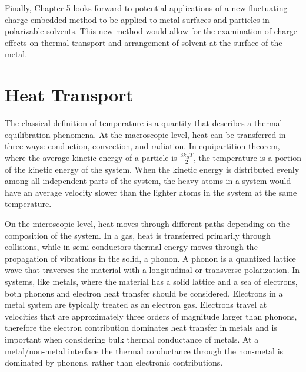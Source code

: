 Finally, Chapter 5 looks forward to potential applications of a new fluctuating charge embedded method to be applied to metal surfaces and particles in polarizable solvents. This new method would allow for the examination of charge effects on thermal transport and arrangement of solvent at the surface of the metal.

\section{Heat Transport}
The classical definition of temperature is a quantity that describes a thermal equilibration phenomena. At the macroscopic level, heat can be transferred in three ways: conduction, convection, and radiation.\cite{Chen2005} 
In equipartition theorem, where the average kinetic energy of a particle is \(\frac{3k_{B}T}{2}\), the temperature is a portion of the kinetic energy of the system. \cite{Goldstein2001}
When the kinetic energy is distributed evenly among all independent parts of the system, the heavy atoms in a system would have an average velocity slower than the lighter atoms in the system at the same temperature.

On the microscopic level, heat moves through different paths depending on the composition of the system.\cite{Chen2005}
In a gas, heat is transferred primarily through collisions, while in semi-conductors thermal energy moves through the propagation of vibrations in the solid, a phonon. 
A phonon is a quantized lattice wave that traverses the material with a longitudinal or transverse polarization.\cite{Kittel} 
In systems, like metals, where the material has a solid lattice and a sea of electrons, both phonons and electron heat transfer should be considered.\cite{Kittel} 
Electrons in a metal system are typically treated as an electron gas.
Electrons travel at velocities that are approximately three orders of magnitude larger than phonons, therefore the electron contribution dominates heat transfer in metals and is important when considering bulk thermal conductance of metals.
At a metal/non-metal interface the thermal conductance through the non-metal is dominated by phonons, rather than electronic contributions.\cite{Chen2005, Cahill2011, Stoner1993}

